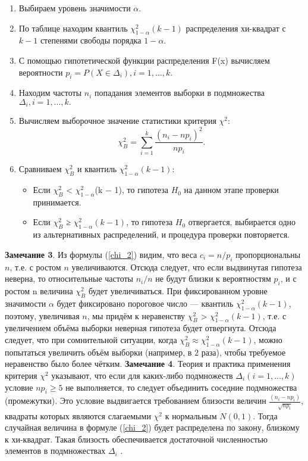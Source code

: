 \documentclass[../body.tex]{subfiles}
\begin{document}
\begin{enumerate}
	\item Выбираем уровень значимости $\alpha$.
	\item  По таблице \cite[c.~ 358]{math} находим квантиль $\chi^{2}_{1-\alpha}(k - 1)$ распределения хи-квадрат с $k−1$ степенями свободы порядка $1-\alpha$. 
	\item С помощью гипотетической функции распределения F(x) вычисляем вероятности $p_{i} = P (X \in \Delta_{i}), i = 1, ... ,k.$
	\item Находим частоты $n_{i}$ попадания элементов выборки в подмножества $\Delta_{i}, i = 1, ... ,k.$ 
	\item Вычисляем выборочное значение статистики критерия $\chi^{2}$:
	\begin{equation}
	\chi^{2}_{B} =\sum_{i = 1}^{k}{\frac{(n_{i} - np_{i})^{2}}{np_{i}}}.
	\label{chi_B}
	\end{equation}
	\item Сравниваем $\chi^{2}_{B}$ и квантиль $\chi^{2}_{1-\alpha}(k-1)$:
	\begin{itemize}
		\item Если $\chi^{2}_{B}$ < $\chi^{2}_{1-\alpha}$(k $-$ 1), то гипотеза $H_{0}$ на данном этапе проверки принимается. 
		\item Если $\chi^{2}_{B}$ ≥ $\chi^{2}_{1-\alpha}(k -1)$, то гипотеза $H_{0}$ отвергается, выбирается одно из альтернативных распределений, и процедура проверки повторяется.
	\end{itemize}
\end{enumerate}
\textbf{Замечание 3}. Из формулы (\ref{chi_2}) видим, что веса $c_{i} = n/p_{i}$ пропорциональны $n$, т.е. с ростом $n$ увеличиваются. Отсюда следует, что если выдвинутая гипотеза неверна, то относительные частоты $n_{i}/n$ не будут близки к вероятностям $p_{i}$, и с ростом n величина  $\chi^{2}_{B}$  будет увеличиваться. При фиксированном уровне значимости $\alpha$ будет фиксировано пороговое число — квантиль $\chi^{2}_{1-\alpha}(k-1)$, поэтому, увеличивая $n$, мы придём к неравенству $\chi^{2}_{B}$ > $\chi^{2}_{1-\alpha}(k-1)$, т.е. с увеличением объёма выборки неверная гипотеза будет отвергнута.
\newline
Отсюда следует, что при сомнительной ситуации, когда $\chi^{2}_{B} \approx \chi^{2}_{1-\alpha}(k-1)$, можно попытаться увеличить объём выборки (например, в $2$ раза), чтобы требуемое неравенство было более чётким.
\newline
\textbf{Замечание 4}. Теория и практика применения критерия  $\chi^{2}$ указывают, что если для каких-либо подмножеств $\Delta_{i} (i = 1, ... ,k)$ условие $np_{i} \geq 5$ не выполняется, то следует объединить соседние подмножества (промежутки).
\newline
Это условие выдвигается требованием близости величин $\frac{(n_{i} −np_{i})}{\sqrt{np_{i}}}$, квадраты которых являются слагаемыми $\chi^{2}$  к нормальным $N(0,1)$. Тогда случайная величина в формуле (\ref{chi_2}) будет распределена по закону, близкому к хи-квадрат. Такая близость обеспечивается достаточной численностью элементов в подмножествах $\Delta_{i}$ \cite[с.~ 481-485]{max}.
		
		
\end{document}
